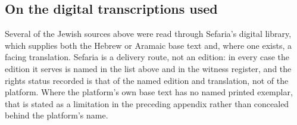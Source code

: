 \subsection{On the digital transcriptions used}

Several of the Jewish sources above were read through Sefaria's digital library,
which supplies both the Hebrew or Aramaic base text and, where one exists, a
facing translation. Sefaria is a delivery route, not an edition: in every case
the edition it serves is named in the list above and in the witness register, and
the rights status recorded is that of the named edition and translation, not of
the platform. Where the platform's own base text has no named printed exemplar,
that is stated as a limitation in the preceding appendix rather than concealed
behind the platform's name.
